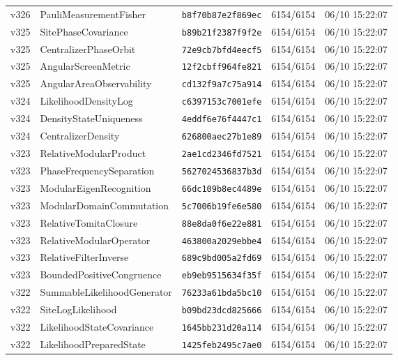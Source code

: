 \documentclass[11pt]{article}
\theoremstyle{definition}\newtheorem{deriv}{Derivação}
\begin{document}
{\begin{longtable}{@{}lllll@{}}
v326 & PauliMeasurementFisher & \texttt{b8f70b87e2f869ec} & 6154/6154 & 06/10 15:22:07 \\
v325 & SitePhaseCovariance & \texttt{b89b21f2387f9f2e} & 6154/6154 & 06/10 15:22:07 \\
v325 & CentralizerPhaseOrbit & \texttt{72e9cb7bfd4eecf5} & 6154/6154 & 06/10 15:22:07 \\
v325 & AngularScreenMetric & \texttt{12f2cbff964fe821} & 6154/6154 & 06/10 15:22:07 \\
v325 & AngularAreaObservability & \texttt{cd132f9a7c75a914} & 6154/6154 & 06/10 15:22:07 \\
v324 & LikelihoodDensityLog & \texttt{c6397153c7001efe} & 6154/6154 & 06/10 15:22:07 \\
v324 & DensityStateUniqueness & \texttt{4eddf6e76f4447c1} & 6154/6154 & 06/10 15:22:07 \\
v324 & CentralizerDensity & \texttt{626800aec27b1e89} & 6154/6154 & 06/10 15:22:07 \\
v323 & RelativeModularProduct & \texttt{2ae1cd2346fd7521} & 6154/6154 & 06/10 15:22:07 \\
v323 & PhaseFrequencySeparation & \texttt{5627024536837b3d} & 6154/6154 & 06/10 15:22:07 \\
v323 & ModularEigenRecognition & \texttt{66dc109b8ec4489e} & 6154/6154 & 06/10 15:22:07 \\
v323 & ModularDomainCommutation & \texttt{5c7006b19fe6e580} & 6154/6154 & 06/10 15:22:07 \\
v323 & RelativeTomitaClosure & \texttt{88e8da0f6e22e881} & 6154/6154 & 06/10 15:22:07 \\
v323 & RelativeModularOperator & \texttt{463800a2029ebbe4} & 6154/6154 & 06/10 15:22:07 \\
v323 & RelativeFilterInverse & \texttt{689c9bd005a2fd69} & 6154/6154 & 06/10 15:22:07 \\
v323 & BoundedPositiveCongruence & \texttt{eb9eb9515634f35f} & 6154/6154 & 06/10 15:22:07 \\
v322 & SummableLikelihoodGenerator & \texttt{76233a61bda5bc10} & 6154/6154 & 06/10 15:22:07 \\
v322 & SiteLogLikelihood & \texttt{b09bd23dcd825666} & 6154/6154 & 06/10 15:22:07 \\
v322 & LikelihoodStateCovariance & \texttt{1645bb231d20a114} & 6154/6154 & 06/10 15:22:07 \\
v322 & LikelihoodPreparedState & \texttt{1425feb2495c7ae0} & 6154/6154 & 06/10 15:22:07 \\

\end{longtable}}
\end{document}
